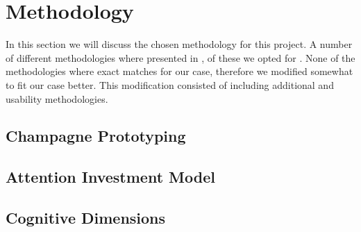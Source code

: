 \section{Methodology}
In this section we will discuss the chosen methodology for this project. A number of different methodologies where presented in , of these we opted for \champagne. None of the methodologies where exact matches for our case, therefore we modified \champagne somewhat to fit our case better. This modification consisted of including additional \attentions and \cognitive usability methodologies.

\subsection{Champagne Prototyping}

\subsection{Attention Investment Model}

\subsection{Cognitive Dimensions}
